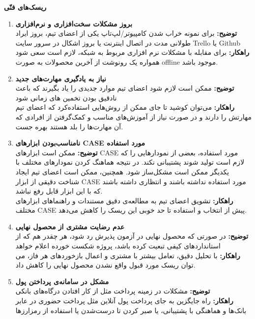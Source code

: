\large \textbf{ریسک‌های فنّی}
\begin{enumerate}[start = 19] 
        \item \textbf{بروز مشکلات سخت‌افزاری و نرم‌افزاری}
       \\\textbf{توضیح: }
        برای نمونه خراب شدن کامپیوتر/لپ‌تاپ یکی از اعضای تیم، بروز ایراد طولانی مدت در اتصال اینترنت یا بروز اشکال در سرور سایت Trello یا Github 
       \\\textbf{راهکار: }
        برای مقابله با مشکلات نرم افزاری مربوط به شبکه، لازم است سعی شود همواره یک رونوشت از آخرین محصولات به صورت offline موجود باشد.
    \item \textbf{نیاز به یادگیری مهارت‌های جدید}
       \\\textbf{توضیح: }
        ممکن است لازم شود اعضای تیم موارد جدیدی را یاد بگیرند که باعث نادقیق بودن تخمین های زمانی شود
       \\\textbf{راهکار: }
        می‌توان کوشید تا جای ممکن از روش‌هایی استفاده‌کرد که اعضای تیم مهارتش را دارند و در صورت نیاز از آموزش‌های مناسب و کمک‌گرفتن از افرادی که آن مهارت‌ها را بلد هستند بهره جست.
    \item \textbf{نامناسب‌بودن ابزارهای CASE مورد استفاده}
       \\\textbf{توضیح: }
        ممکن است ابزارهای CASE مورد استفاده، بعضی از نمودارهایی را که لازم است تولید شوند پشتیبانی نکند. در نتیجه هماهنگ کردن نمودارهای مختلف با یکدیگر ممکن است مشکل‌ساز شود. همچنین، ممکن است اعضای تیم ایجاد شناخت دقیقی از ابزار CASE مورد استفاده نداشته باشند و انتظاری داشته باشند که با این ابزار قابل رفع نباشد.
       \\\textbf{راهکار: }
        تشویق اعضای تیم به مطالعه‌ی دقیق مستندات و راهنماهای ابزارهای مختلف CASE پیش از انتخاب و استفاده تا حد خوبی این ریسک را کاهش می‌دهد.
    \item \textbf{عدم رضایت مشتری از محصول نهایی}
       \\\textbf{توضیح: }
        در صورتی که محصول نهایی در آزمون پذیرش رد شود، هر چقدر هم که از استانداردهای کیفی تبعیت کرده باشد، پروژه شکست خورده اعلام خواهد
       \\\textbf{راهکار: }
        با تحلیل دقیق، تعامل بیشتر با مشتری و اعمال بازخوردهای هر فاز، می توان ریسک مورد قبول واقع نشدن محصول نهایی را کاهش داد.
    \item \textbf{مشکل در سامانه‌ی پرداختن پول}
       \\\textbf{توضیح: }
        مشکلات در زمینه پرداخت مثل از کار افتادن درگاه‌های بانکی
       \\\textbf{راهکار: }
        راه جایگزین به جای پرداخت پول آنلاین مثل پرداخت حضوری در عابر بانک‌ها و هماهنگی با پشتیبانی، یا صبر کردن تا درست‌شدن یا استفاده از رمزارزها

\end{enumerate}
